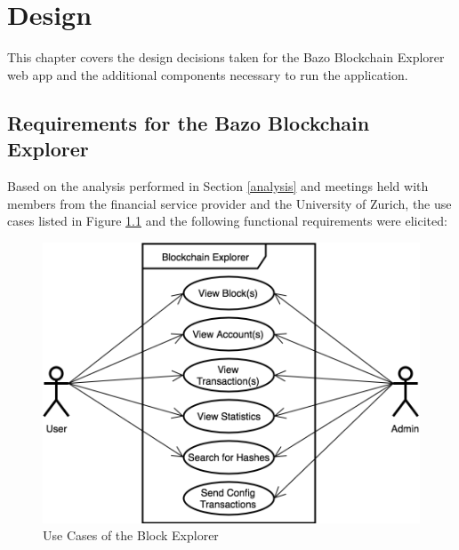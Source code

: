 \chapter{Design} \label{chap:design}
This chapter covers the design decisions taken for the Bazo Blockchain Explorer web app and the additional components necessary to run the application.

\section{Requirements for the Bazo Blockchain Explorer}
Based on the analysis performed in Section \ref{analysis} and meetings held with members from the financial service provider and the University of Zurich, the use cases listed in Figure \ref{fig:usecase1} and the following functional requirements were elicited:

\begin{figure}
  \includegraphics[scale=0.35]{usecase1.png}
  \centering
  \caption{Use Cases of the Block Explorer}
  \label{fig:usecase1}
\end{figure}

